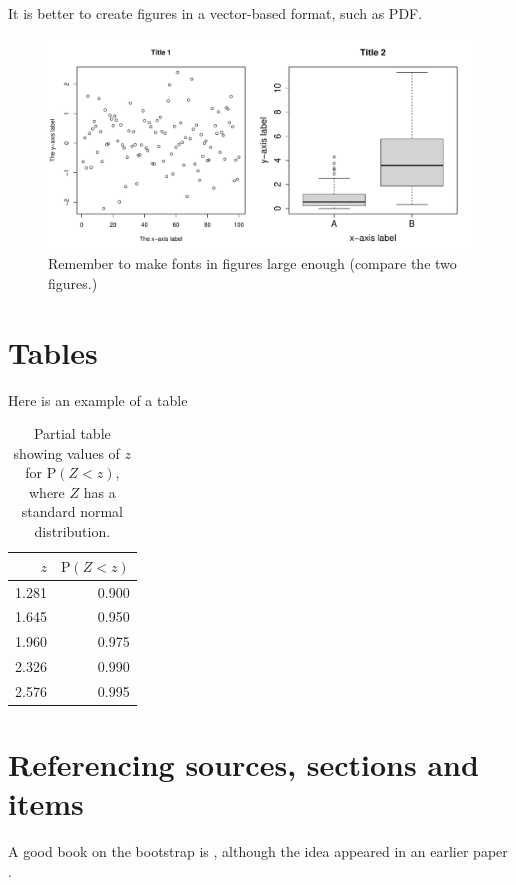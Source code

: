 \documentclass{statsmsc}
\begin{document}
It is better to create figures in a vector-based format, such as PDF.

\begin{figure}[!h]
    \centering
    \includegraphics[width=\textwidth]{figures/fig1.pdf}
    \caption{Remember to make fonts in figures large enough (compare the two figures.)}
    \label{fig:fig1}
\end{figure}

\section{Tables}

\label{sec:tablesection}

Here is an example of a table

\begin{table}[ht]
\centering
\begin{tabular}{rr}
  \hline
    $z$& $\textrm{P}(Z < z)$ \\
  \hline
    1.281& 0.900\\
    1.645& 0.950\\
    1.960& 0.975\\
    2.326& 0.990 \\
    2.576& 0.995 \\
   \hline
\end{tabular}
    \caption{Partial table showing values of $z$ for $\textrm{P}(Z < z)$, 
    where $Z$ has a standard normal distribution.}
    \label{tab:normal}
\end{table}



\section{Referencing sources, sections and items}

A good book on the bootstrap is \cite{efrontib}, although the idea
appeared in an earlier paper \citep{efron1979}.
\end{document}
